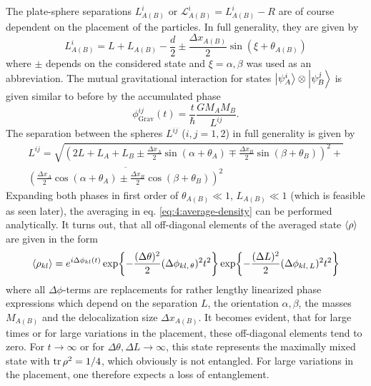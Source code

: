 The plate-sphere separations $L^i_{A(B)}$ or $\mathscr{L}^i_{A(B)} = L^i_{A(B)}-R$ are of course dependent on the placement of the particles.
In full generality, they are given by
\begin{equation}
  L^i_{A(B)} = L + L_{A(B)} - \frac{d}{2} \pm \frac{\Delta x_{A(B)}}{2} \sin(\xi + \theta_{A(B)})
\end{equation}
where $\pm$ depends on the considered state and $\xi = \alpha, \beta$ was used as an abbreviation.
The mutual gravitational interaction for states $\ket{\psi^i_A}\otimes\ket{\psi^j_B}$ is given similar to before by the accumulated phase
\begin{equation}
  \phi^{ij}_\mathrm{Grav}(t) = \frac{t}{\hbar} \frac{G M_A M_B}{L^{ij}} .
\end{equation}
The separation between the spheres $L^{ij}$ ($i,j = 1,2$) in full generality is given by
\begin{multline}
  L^{ij} = \sqrt{\left(2L + L_A + L_B \pm \frac{\Delta x_A}{2}\sin(\alpha + \theta_A) \mp \frac{\Delta x_B}{2}\sin(\beta + \theta_B)\right)^2 +} \\ \overline{\left(\frac{\Delta x_A}{2}\cos(\alpha + \theta_A) \pm \frac{\Delta x_B}{2}\cos(\beta + \theta_B)\right)^2}
\end{multline}
Expanding both phases in first order of $\theta_{A(B)} \ll 1$, $L_{A(B)} \ll 1$ (which is feasible as seen later), the averaging in eq. \eqref{eq:4:average-density} can be performed analytically.
It turns out, that all off-diagonal elements of the averaged state $\left\langle\rho\right\rangle$ are given in the form
\begin{equation}
  \left\langle\rho_{kl}\right\rangle = e^{i \Delta \phi_{kl}(t)} \exp{-\frac{(\Delta\theta)^2}{2} (\Delta\phi_{kl,\,\theta})^2 t^2} \exp{-\frac{(\Delta L)^2}{2} (\Delta\phi_{kl,\,L})^2 t^2}
\end{equation}
where all $\Delta \phi$-terms are replacements for rather lengthy linearized phase expressions which depend on the separation $L$, the orientation $\alpha, \beta$, the masses $M_{A(B)}$ and the delocalization size $\Delta x_{A(B)}$.
It becomes evident, that for large times or for large variations in the placement, these off-diagonal elements tend to zero. 
For $t\rightarrow \infty$ or for $\Delta \theta, \Delta L \rightarrow \infty$, this state represents the maximally mixed state with $\tr\rho^2 = 1/4$, which obviously is not entangled.
For large variations in the placement, one therefore expects a loss of entanglement.

